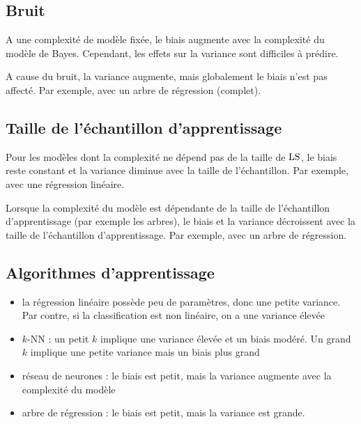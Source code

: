 		\subsection{Bruit}
		
		A une complexité de modèle fixée, le biais augmente avec la complexité du modèle de Bayes. Cependant, les effets sur la variance sont difficiles à prédire.
		
		A cause du bruit, la variance augmente, mais globalement le biais n'est pas affecté. Par exemple, avec un arbre de régression (complet).
		
		
		\subsection{Taille de l'échantillon d'apprentissage}
		
		Pour les modèles dont la complexité ne dépend pas de la taille de $\text{LS}$, le biais reste constant et la variance diminue avec la taille de l'échantillon. Par exemple, avec une régression linéaire.
		
		
		Lorsque la complexité du modèle est dépendante de la taille de l'échantillon d'apprentissage (par exemple les arbres), le biais et la variance décroissent avec la taille de l'échantillon d'apprentissage. Par exemple, avec un arbre de régression.
		
		
		\subsection{Algorithmes d'apprentissage}
		
		
		
		\begin{itemize}
			\item la régression linéaire possède peu de paramètres, donc une petite variance. Par contre, si la classification est non linéaire, on a une variance élevée
			\item $k$-NN : un petit $k$ implique une variance élevée et un biais modéré. Un grand $k$ implique une petite variance mais un biais plus grand
			\item réseau de neurones : le biais est petit, mais la variance augmente avec la complexité du modèle
			\item arbre de régression : le biais est petit, mais la variance est grande.
		\end{itemize}
